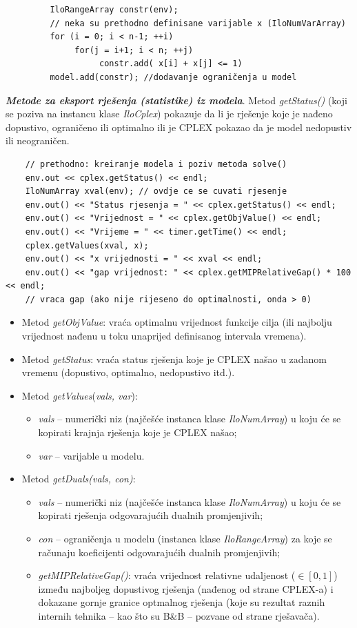 \documentclass[a4paper, utf8, 11pt, colorlinks]{book}
\begin{document}
 \begin{verbatim}
 	     IloRangeArray constr(env);
 	     // neka su prethodno definisane varijable x (IloNumVarArray) 
 	     for (i = 0; i < n-1; ++i)
 	          for(j = i+1; i < n; ++j)
 	               constr.add( x[i] + x[j] <= 1)     
      	 model.add(constr); //dodavanje ograničenja u model
 \end{verbatim}
 
 \noindent \textbf{\emph{Metode za eksport rješenja (statistike) iz modela}}. Metod \emph{getStatus()} (koji se poziva na instancu klase \emph{IloCplex})  pokazuje da li je rješenje koje je nađeno dopustivo, ograničeno ili optimalno ili je CPLEX pokazao da je model nedopustiv ili neograničen.
 
 \begin{verbatim}
 	// prethodno: kreiranje modela i poziv metoda solve()
    env.out << cplex.getStatus() << endl;
 	IloNumArray xval(env); // ovdje ce se cuvati rjesenje
 	env.out() << "Status rjesenja = " << cplex.getStatus() << endl;
 	env.out() << "Vrijednost = " << cplex.getObjValue() << endl;
 	env.out() << "Vrijeme = " << timer.getTime() << endl;
 	cplex.getValues(xval, x);
 	env.out() << "x vrijednosti = " << xval << endl;
 	env.out() << "gap vrijednost: " << cplex.getMIPRelativeGap() * 100 << endl; 
 	// vraca gap (ako nije rijeseno do optimalnosti, onda > 0)
 \end{verbatim}
\begin{itemize}
	\item Metod \emph{getObjValue}: vraća optimalnu vrijednost funkcije cilja (ili najbolju vrijednost nađenu u toku unaprijed definisanog intervala vremena).
	\item Metod \emph{getStatus}: vraća status rješenja koje je CPLEX našao u zadanom vremenu (dopustivo, optimalno, nedopustivo itd.).
	\item Metod \emph{getValues}(\emph{vals, var}): 
	\begin{itemize}
	 	  \item \emph{vals} -- numerički niz (najčešće instanca klase \emph{IloNumArray}) u koju će se kopirati krajnja rješenja koje je CPLEX našao;    
          \item \emph{var} -- varijable u modelu.
    \end{itemize}
     \item Metod \emph{getDuals(vals, con)}:
     \begin{itemize}
     	\item \emph{vals} -- numerički niz (najčešće instanca klase \emph{IloNumArray}) u koju će se kopirati rješenja odgovarajućih dualnih promjenjivih;
     	\item \emph{con} -- ograničenja u modelu (instanca klase \emph{IloRangeArray}) za koje se računaju koeficijenti odgovarajućih dualnih promjenjivih;
     	\item \emph{getMIPRelativeGap()}: vraća vrijednost relativne udaljenost ($\in [0, 1]$) između najboljeg dopustivog rješenja (nađenog od strane CPLEX-a) i dokazane gornje granice optmalnog rješenja (koje su rezultat raznih internih tehnika -- kao što su B\&B -- pozvane od strane rješavača).
     \end{itemize}
\end{itemize}
\end{document}
